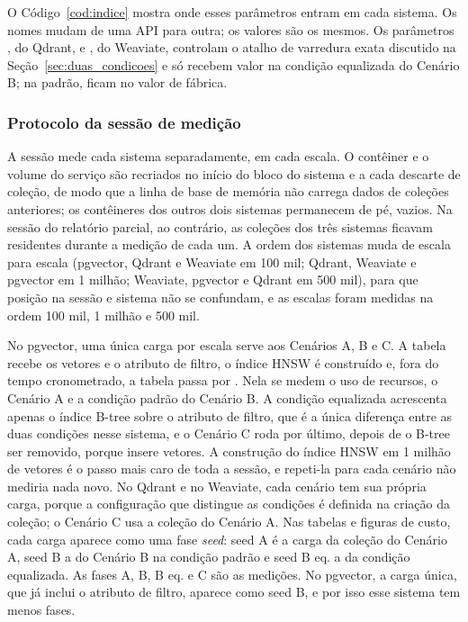 O Código~\ref{cod:indice} mostra onde esses parâmetros entram em cada sistema. Os nomes mudam de uma API para outra; os valores são os mesmos. Os parâmetros , do Qdrant, e , do Weaviate, controlam o atalho de varredura exata discutido na Seção~\ref{sec:duas_condicoes} e só recebem valor na condição equalizada do Cenário B; na padrão, ficam no valor de fábrica.



\subsubsection{Protocolo da sessão de medição}
\label{sec:protocolo}

A sessão mede cada sistema separadamente, em cada escala. O contêiner e o volume do serviço são recriados no início do bloco do sistema e a cada descarte de coleção, de modo que a linha de base de memória não carrega dados de coleções anteriores; os contêineres dos outros dois sistemas permanecem de pé, vazios. Na sessão do relatório parcial, ao contrário, as coleções dos três sistemas ficavam residentes durante a medição de cada um. A ordem dos sistemas muda de escala para escala (pgvector, Qdrant e Weaviate em 100 mil; Qdrant, Weaviate e pgvector em 1 milhão; Weaviate, pgvector e Qdrant em 500 mil), para que posição na sessão e sistema não se confundam, e as escalas foram medidas na ordem 100 mil, 1 milhão e 500 mil.

No pgvector, uma única carga por escala serve aos Cenários A, B e C. A tabela recebe os vetores e o atributo de filtro, o índice HNSW é construído e, fora do tempo cronometrado, a tabela passa por . Nela se medem o uso de recursos, o Cenário A e a condição padrão do Cenário B. A condição equalizada acrescenta apenas o índice B-tree sobre o atributo de filtro, que é a única diferença entre as duas condições nesse sistema, e o Cenário C roda por último, depois de o B-tree ser removido, porque insere vetores. A construção do índice HNSW em 1 milhão de vetores é o passo mais caro de toda a sessão, e repeti-la para cada cenário não mediria nada novo. No Qdrant e no Weaviate, cada cenário tem sua própria carga, porque a configuração que distingue as condições é definida na criação da coleção; o Cenário C usa a coleção do Cenário A. Nas tabelas e figuras de custo, cada carga aparece como uma fase \textit{seed}: seed A é a carga da coleção do Cenário A, seed B a do Cenário B na condição padrão e seed B eq. a da condição equalizada. As fases A, B, B eq. e C são as medições. No pgvector, a carga única, que já inclui o atributo de filtro, aparece como seed B, e por isso esse sistema tem menos fases.

